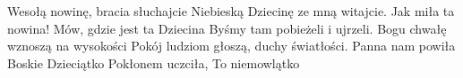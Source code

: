 \beginverse
Wesołą nowinę, bracia słuchajcie
Niebieską Dziecinę ze mną witajcie.
\endverse
\beginchorus
Jak miła ta nowina!
Mów, gdzie jest ta Dziecina
Byśmy tam pobieżeli i ujrzeli.
\endchorus
\beginverse
Bogu chwałę wznoszą na wysokości
Pokój ludziom głoszą, duchy światłości.
\endverse
\beginverse
Panna nam powiła Boskie Dzieciątko
Pokłonem uczciła, To niemowlątko
\endverse
\endsong